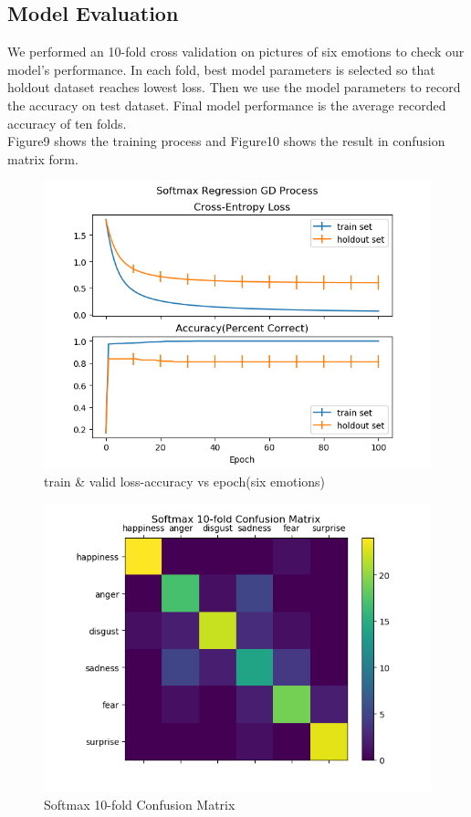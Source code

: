 \documentclass{article} %
\begin{document}
\subsection {Model Evaluation}
We performed an 10-fold cross validation on pictures of six emotions to check our model's performance. In each fold, best model parameters is selected so that holdout dataset reaches lowest loss. Then we use the model parameters to record the accuracy on test dataset. Final model performance is the average recorded accuracy of ten folds. \\
Figure9 shows the training process and Figure10 shows the result in confusion matrix form.
\begin{figure}[h]
	\centering
	\includegraphics[scale=0.5]{./graph/softmax_tvloss_acc.png}
	\caption{train \& valid loss-accuracy vs epoch(six emotions)}
\end{figure}
\begin{figure}[h]
	\centering
	\includegraphics[scale=0.5]{./graph/confusion.png}
	\caption{Softmax 10-fold Confusion Matrix}
\end{figure} 
\end{document}
